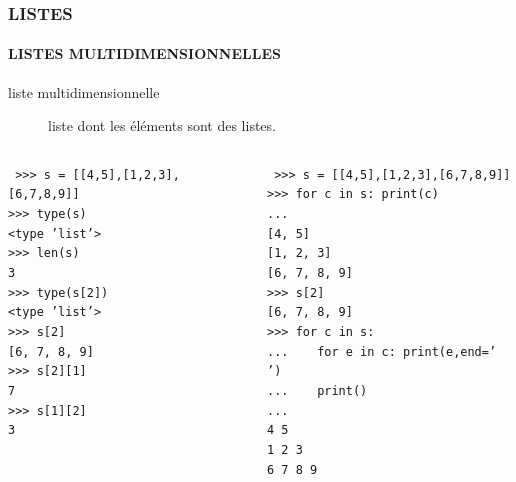\begin{frame}
\frametitle{\uppercase{Listes}}
\framesubtitle{\uppercase{Listes multidimensionnelles}}
\begin{description}
\item[liste multidimensionnelle] liste dont les éléments sont des listes.
\end{description}

\begin{columns}[T]
\column{5.25cm}
\begin{py}{5.25cm}\tt
>{>}> s = [[4,5],[1,2,3],[6,7,8,9]]\\%
>{>}> type(s)\\
<type 'list'>\\%
>{>}> len(s)\\
3\\%
>{>}> type(s[2])\\
<type 'list'>\\%
>{>}> s[2]\\
\mbox{}[6, 7, 8, 9]\\%
>{>}> s[2][1]\\
7\\
>{>}> s[1][2]\\
3
\end{py}

\column{5.25cm}
\begin{py}{5.25cm}\tt
>{>}> s = [[4,5],[1,2,3],[6,7,8,9]]\\
>{>}> for c in s: print(c) \\
... \\
\mbox{}[4, 5]\\
\mbox{}[1, 2, 3]\\
\mbox{}[6, 7, 8, 9]\\%
>{>}> s[2]\\
\mbox{}[6, 7, 8, 9]\\%
>{>}> for c in s:\\
...\ \ \ \ for e in c: print(e,end=' ')\\
...\ \ \ \ print()\\
... \\
4 5\\
1 2 3\\
6 7 8 9
\end{py}
\end{columns}

\end{frame}
